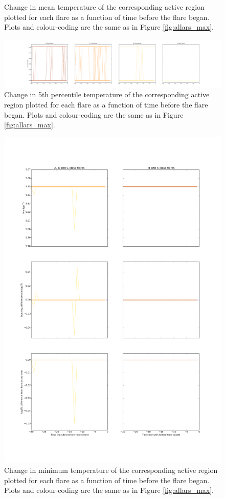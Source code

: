 \documentclass[referee,a4paper,12pt]{swsc}
\begin{document}
\begin{linenumbers}
\begin{figure}
	\caption{Change in mean temperature of the corresponding active region plotted for each flare as a function of time before the flare began. Plots and colour-coding are the same as in Figure \ref{fig:allars_max}.}
	\label{fig:allars_mean}
\end{figure}
\begin{figure}
	\centering
		\includegraphics[width=0.7\columnwidth]{tempplots_p5/allars.png}
	\caption{Change in 5th percentile temperature of the corresponding active region plotted for each flare as a function of time before the flare began. Plots and colour-coding are the same as in Figure \ref{fig:allars_max}.}
	\label{fig:allars_p5}
\end{figure}
\begin{figure}
	\centering
		\includegraphics[width=0.7\columnwidth]{tempplots_min/allars.png}
	\caption{Change in minimum temperature of the corresponding active region plotted for each flare as a function of time before the flare began. Plots and colour-coding are the same as in Figure \ref{fig:allars_max}.}
	\label{fig:allars_min}
\end{figure}


\end{linenumbers}
\end{document}
